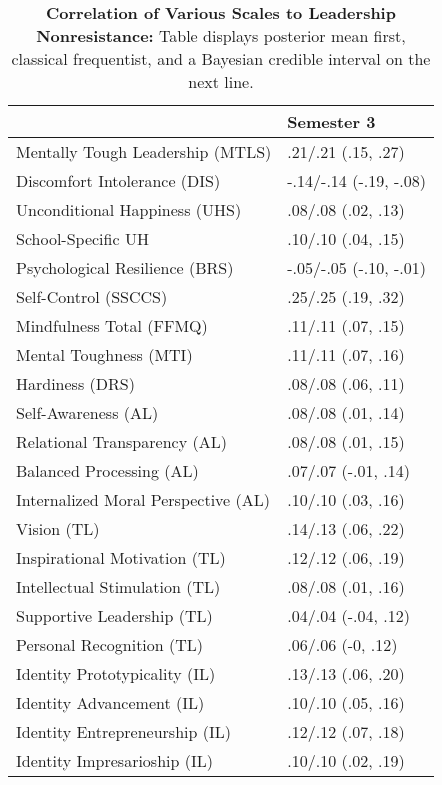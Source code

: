 \begin{table}[ht]
\centering
\begin{tabular}{ll}
  \hline
 & Semester 3 \\ 
  \hline
Mentally Tough Leadership (MTLS) & .21/.21 (.15, .27) \\ 
  Discomfort Intolerance (DIS) & -.14/-.14 (-.19, -.08) \\ 
  Unconditional Happiness (UHS) & .08/.08 (.02, .13) \\ 
  School-Specific UH & .10/.10 (.04, .15) \\ 
  Psychological Resilience (BRS) & -.05/-.05 (-.10, -.01) \\ 
  Self-Control (SSCCS) & .25/.25 (.19, .32) \\ 
  Mindfulness Total (FFMQ) & .11/.11 (.07, .15) \\ 
  Mental Toughness (MTI) & .11/.11 (.07, .16) \\ 
  Hardiness (DRS) & .08/.08 (.06, .11) \\ 
  Self-Awareness (AL) & .08/.08 (.01, .14) \\ 
  Relational Transparency (AL) & .08/.08 (.01, .15) \\ 
  Balanced Processing (AL) & .07/.07 (-.01, .14) \\ 
  Internalized Moral Perspective (AL) & .10/.10 (.03, .16) \\ 
  Vision (TL) & .14/.13 (.06, .22) \\ 
  Inspirational Motivation (TL) & .12/.12 (.06, .19) \\ 
  Intellectual Stimulation (TL) & .08/.08 (.01, .16) \\ 
  Supportive Leadership (TL) & .04/.04 (-.04, .12) \\ 
  Personal Recognition (TL) & .06/.06 (-0, .12) \\ 
  Identity Prototypicality (IL) & .13/.13 (.06, .20) \\ 
  Identity Advancement (IL) & .10/.10 (.05, .16) \\ 
  Identity Entrepreneurship (IL) & .12/.12 (.07, .18) \\ 
  Identity Impresarioship (IL) & .10/.10 (.02, .19) \\ 
   \hline
\end{tabular}
\caption{\textbf{Correlation of Various Scales to Leadership Nonresistance:} Table displays posterior mean first, classical frequentist, and a Bayesian credible interval on the next line.} 
\label{tab:lnr_corr}
\end{table}
